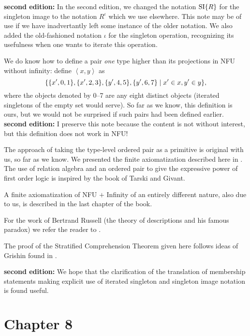{\bf second edition:}  In the second edition, we changed the notation $\mathop{\mathrm{SI}}\{R\}$ for the singleton image to the notation $R^{\iota}$ which we use elsewhere.  This note may be of use if we have inadvertantly left some instance of the older notation.  We also added the old-fashioned notation
$\iota$ for the singleton operation, recognizing its usefulness when one wants to iterate this operation.

We do know how to define a pair {\itshape one\/} type higher than its
projections in NFU without
infinity: define $\left<x,y\right>$
as
$$
 \{\{x',0,1\}, \{x',2,3\},\{y',4,5\},\{y',6,7\}\mid x' \in x, y'\in y\},
$$
where the objects denoted by 0--7 are any eight distinct objects
(iterated singletons of the empty set would serve).  So far as we 
know, this definition is ours, but we would not be surprised if such
pairs had been defined earlier.  {\bf second edition:}  I preserve this note because the content is not without interest, but this definition does not work in NFU!

The approach of taking the type-level ordered
pair as a primitive is 
original with us, so far as we know.  We presented the finite
axiomatization described here in \cite{modernlogic}.  The use of
relation algebra and an ordered pair to give the expressive power of
first order logic is inspired by the book \cite{tarski-givant} of
Tarski and Givant.

A finite axiomatization of NFU $+$ Infinity of an
entirely different nature, also due to us, is described in the last chapter of
the book.

For the work of Bertrand Russell (the theory of descriptions and his
famous paradox) we refer the reader to \cite{russell}.

The proof of the Stratified Comprehension Theorem given here follows 
ideas of Grishin found in \cite{grishin}.

{\bf second edition:}  We hope that the clarification of the translation of membership statements making explicit use of iterated singleton and singleton image notation is found useful.


\section*{Chapter 8}

